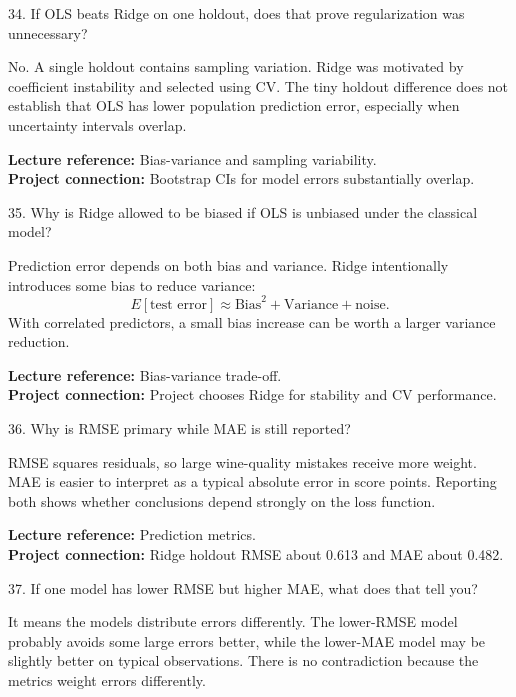 \documentclass[10.5pt,a4paper]{article}
\newcommand{\chapref}[1]{\textbf{Lecture reference:} #1}
\newcommand{\projectref}[1]{\textbf{Project connection:} #1}
\begin{document}
\begin{qbox}{34. If OLS beats Ridge on one holdout, does that prove regularization was unnecessary?}
\end{qbox}
\begin{answerbox}No. A single holdout contains sampling variation. Ridge was motivated by coefficient instability and selected using CV. The tiny holdout difference does not establish that OLS has lower population prediction error, especially when uncertainty intervals overlap.\end{answerbox}
\begin{refbox}\chapref{Bias-variance and sampling variability.}\\\projectref{Bootstrap CIs for model errors substantially overlap.}\end{refbox}
\begin{qbox}{35. Why is Ridge allowed to be biased if OLS is unbiased under the classical model?}
\end{qbox}
\begin{answerbox}Prediction error depends on both bias and variance. Ridge intentionally introduces some bias to reduce variance:
\[
E[\text{test error}]\approx \text{Bias}^2+\text{Variance}+\text{noise}.
\]
With correlated predictors, a small bias increase can be worth a larger variance reduction.\end{answerbox}
\begin{refbox}\chapref{Bias-variance trade-off.}\\\projectref{Project chooses Ridge for stability and CV performance.}\end{refbox}
\begin{qbox}{36. Why is RMSE primary while MAE is still reported?}
\end{qbox}
\begin{answerbox}RMSE squares residuals, so large wine-quality mistakes receive more weight. MAE is easier to interpret as a typical absolute error in score points. Reporting both shows whether conclusions depend strongly on the loss function.\end{answerbox}
\begin{refbox}\chapref{Prediction metrics.}\\\projectref{Ridge holdout RMSE about 0.613 and MAE about 0.482.}\end{refbox}
\begin{qbox}{37. If one model has lower RMSE but higher MAE, what does that tell you?}
\end{qbox}
\begin{answerbox}It means the models distribute errors differently. The lower-RMSE model probably avoids some large errors better, while the lower-MAE model may be slightly better on typical observations. There is no contradiction because the metrics weight errors differently.\end{answerbox}
\end{document}
